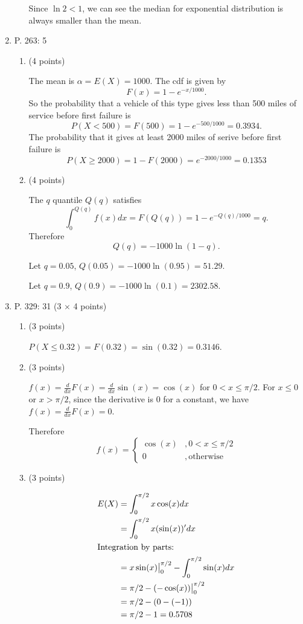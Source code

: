 \documentclass{article}\usepackage[]{graphicx}\usepackage[]{color}
\begin{document}
\begin{enumerate}
\begin{itemize}
	Since $\ln 2 < 1$, we can see the median for exponential distribution is always smaller than the mean.
	\end{itemize}
	
	
	\item P. 263: 5 
	
	\begin{enumerate}
	\item (4 points)
	
	The mean is $\alpha = E(X) = 1000$. The cdf is given by 
	\[F(x) = 1 - e^{-x/1000}.\]
	So the probability that a vehicle of this type gives less than 500 miles of service before first failure is
	\[P(X < 500) = F(500) = 1 - e^{-500/1000} = 0.3934.\]
	The probability that it gives at least 2000 miles of serive before first failure is
	\[P(X \geq 2000) = 1 - F(2000) = e^{-2000/1000} = 0.1353\]
	\item (4 points)
	
	The $q$ quantile $Q(q)$ satisfies
	\[\int_{0}^{Q(q)} f(x) dx = F(Q(q)) = 1 - e^{-Q(q)/1000} = q.\]
	Therefore 
	\[Q(q) = -1000\ln(1 - q).\]
	
	Let $q = 0.05$, $Q(0.05) = -1000 \ln (0.95) = 51.29$.
	
	Let $q = 0.9$, $Q(0.9) = -1000 \ln(0.1) = 2302.58$.
 	\end{enumerate}
	\item P. 329: 31 (3 $\times$ 4 points)
	\begin{enumerate}
	\item (3 points)
	
	$P(X \leq 0.32) = F(0.32) = \sin(0.32) = 0.3146$.
	
	\item (3 points)
	
	$f(x) = \frac{d}{dx}F(x) = \frac{d}{dx} \sin(x) = \cos(x)$ for $0 < x \leq \pi/2$. For $x \leq 0$ or $x > \pi/2$, since the derivative is 0 for a constant, we have $f(x) = \frac{d}{dx} F(x) = 0$.
	
	Therefore
	\[f(x) = \begin{cases}
	\cos(x) & , 0 < x \leq \pi/2\\
	0 &, \mathrm{otherwise}
	\end{cases}\]
	
	\item (3 points)
	
	\begin{align*}
	E(X) & = \int_{0}^{\pi/2} x \cos(x) dx \\
	& = \int_{0}^{\pi/2} x (\sin(x))' dx \\
	\intertext{Integration by parts:}
	& = x \sin(x) \big|_0^{\pi/2} - \int_{0}^{\pi/2} \sin(x) dx\\
	& = \pi/2 - (-\cos(x))\big|_{0}^{\pi/2}\\
	& = \pi/2 - (0 - (-1)) \\
	& = \pi/2 - 1 = 0.5708
	\end{align*}
	

\end{enumerate}
\end{enumerate}
\end{document}
